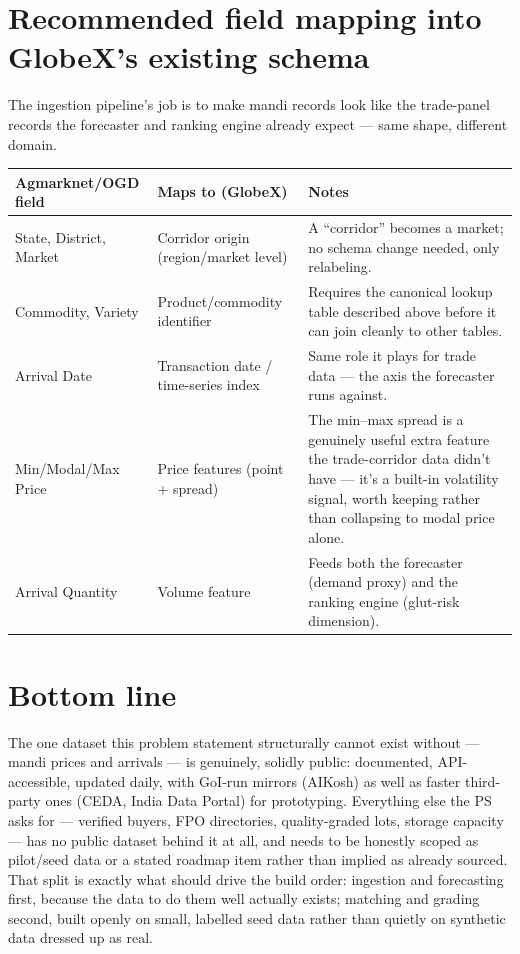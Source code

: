 \documentclass[11pt]{article}
\begin{document}
\clearpage
\section{Recommended field mapping into GlobeX's existing schema}
The ingestion pipeline's job is to make mandi records look like the trade-panel records the forecaster and
ranking engine already expect --- same shape, different domain.

\renewcommand{\arraystretch}{1.3}
\noindent\begin{longtable}{@{}p{4.6cm}p{4.6cm}p{5.4cm}@{}}
\toprule
\textbf{Agmarknet/OGD field} & \textbf{Maps to (GlobeX)} & \textbf{Notes} \\
\midrule
\endhead
State, District, Market & Corridor origin (region/market level) & A ``corridor'' becomes a market; no
schema change needed, only relabeling. \\[0.3em]
Commodity, Variety & Product/commodity identifier & Requires the canonical lookup table described above
before it can join cleanly to other tables. \\[0.3em]
Arrival Date & Transaction date / time-series index & Same role it plays for trade data --- the axis the
forecaster runs against. \\[0.3em]
Min/Modal/Max Price & Price features (point + spread) & The min--max spread is a genuinely useful extra
feature the trade-corridor data didn't have --- it's a built-in volatility signal, worth keeping rather than
collapsing to modal price alone. \\[0.3em]
Arrival Quantity & Volume feature & Feeds both the forecaster (demand proxy) and the ranking engine
(glut-risk dimension). \\
\bottomrule
\end{longtable}

\section*{Bottom line}
The one dataset this problem statement structurally cannot exist without --- mandi prices and arrivals --- is
genuinely, solidly public: documented, API-accessible, updated daily, with GoI-run mirrors (AIKosh) as well
as faster third-party ones (CEDA, India Data Portal) for prototyping. Everything else the PS asks for ---
verified buyers, FPO directories, quality-graded lots, storage capacity --- has no public dataset behind it
at all, and needs to be honestly scoped as pilot/seed data or a stated roadmap item rather than implied as
already sourced. That split is exactly what should drive the build order: ingestion and forecasting first,
because the data to do them well actually exists; matching and grading second, built openly on small,
labelled seed data rather than quietly on synthetic data dressed up as real.
\end{document}
